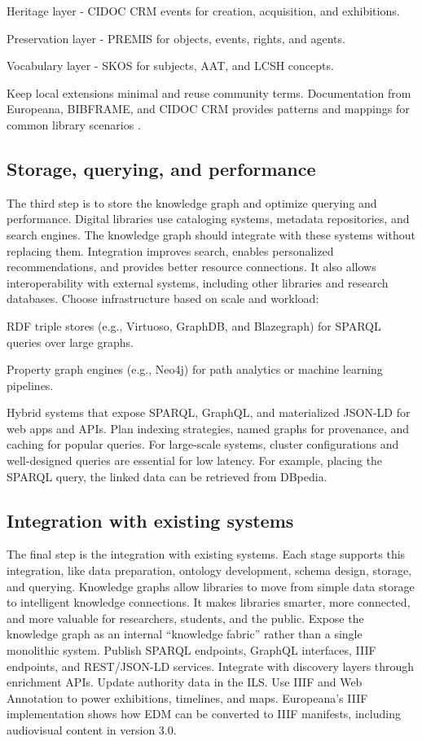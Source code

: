 \documentclass[12pt,a4paper]{article}
\begin{document}
Heritage layer - CIDOC CRM events for creation, acquisition, and exhibitions.

Preservation layer - PREMIS for objects, events, rights, and agents.

Vocabulary layer - SKOS for subjects, AAT, and LCSH concepts.

Keep local extensions minimal and reuse community terms. Documentation from Europeana, BIBFRAME, and CIDOC CRM provides patterns and mappings for common library scenarios \cite{ji2020survey}.

\subsection{Storage, querying, and performance}
The third step is to store the knowledge graph and optimize querying and performance. Digital libraries use cataloging systems, metadata repositories, and search engines. The knowledge graph should integrate with these systems without replacing them. Integration improves search, enables personalized recommendations, and provides better resource connections. It also allows interoperability with external systems, including other libraries and research databases. Choose infrastructure based on scale and workload:

RDF triple stores (e.g., Virtuoso, GraphDB, and Blazegraph) for SPARQL queries over large graphs.

Property graph engines (e.g., Neo4j) for path analytics or machine learning pipelines.

Hybrid systems that expose SPARQL, GraphQL, and materialized JSON-LD for web apps and APIs. Plan indexing strategies, named graphs for provenance, and caching for popular queries. For large-scale systems, cluster configurations and well-designed queries are essential for low latency. For example, placing the SPARQL query, the linked data can be retrieved from DBpedia.

\subsection{Integration with existing systems}
The final step is the integration with existing systems. Each stage supports this integration, like data preparation, ontology development, schema design, storage, and querying. Knowledge graphs allow libraries to move from simple data storage to intelligent knowledge connections. It makes libraries smarter, more connected, and more valuable for researchers, students, and the public. Expose the knowledge graph as an internal “knowledge fabric” rather than a single monolithic system. Publish SPARQL endpoints, GraphQL interfaces, IIIF endpoints, and REST/JSON-LD services. Integrate with discovery layers through enrichment APIs. Update authority data in the ILS. Use IIIF and Web Annotation to power exhibitions, timelines, and maps. Europeana’s IIIF implementation shows how EDM can be converted to IIIF manifests, including audiovisual content in version 3.0.
\end{document}
